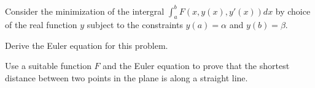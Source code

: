 Consider the minimization of the intergral $\int_a^b F(x,y(x),y'(x))
dx$ by choice of the real function $y$ subject to the constraints
$y(a)=\alpha$ and $y(b)=\beta$.
\begin{alist}
\item Derive the Euler equation for this problem.
\item Use a suitable function $F$ and the Euler equation to prove that
the shortest distance between two points in the plane is along a
straight line.
\end{alist}
